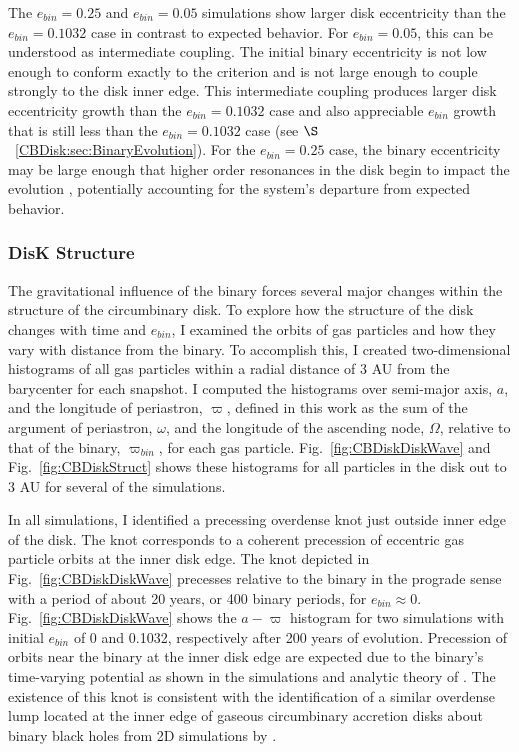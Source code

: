The $e_{bin} = 0.25$ and $e_{bin} = 0.05$ simulations show larger disk eccentricity than
the $e_{bin} = 0.1032$ case in contrast to expected behavior.  For
$e_{bin} = 0.05$, this can be understood as intermediate coupling.
The initial binary eccentricity is not low enough to conform exactly
to the \citet{Papaloizou2001} criterion and is not large enough to
couple strongly to the disk inner edge. This intermediate
coupling produces larger disk eccentricity growth than the $e_{bin} = 0.1032$ case and also
appreciable $e_{bin}$ growth that is still less than the $e_{bin} = 0.1032$ case (see $\S$~\ref{CBDisk:sec:BinaryEvolution}).  For
the $e_{bin} = 0.25$ case, the binary eccentricity may be large enough that higher order resonances in the disk begin to impact the evolution \citep{Artymowicz1992}, potentially accounting for the system's departure from expected behavior.


\subsubsection{DisK Structure} \label{CBDisk:sec:discStructEvolution}

The gravitational influence of the binary forces several major changes within the structure of the circumbinary disk.  To explore how the
structure of the disk changes with time and $e_{bin}$, I examined the orbits of gas
particles and how they vary with distance from the binary.  To
accomplish this, I created two-dimensional histograms of all gas particles
within a radial distance of 3 AU from the barycenter for
each snapshot.  I computed the histograms over semi-major
axis, $a$, and the longitude of periastron, $\varpi$, defined in this
work as the sum of the argument of periastron, $\omega$, and the
longitude of the ascending node, $\Omega$, relative to that of the binary, $\varpi_{bin}$, for each gas particle. 
Fig.~\ref{fig:CBDiskDiskWave} and Fig.~\ref{fig:CBDiskStruct} shows these histograms
for all particles in the disk out to 3 AU
for several of the simulations.

In all simulations, I identified a precessing overdense knot just outside
inner edge of the disk.  The knot corresponds to a coherent precession
of eccentric gas particle orbits at the inner disk edge.  The knot
depicted in Fig.~\ref{fig:CBDiskDiskWave} precesses relative to the binary
in the prograde sense with a period of about 20 years, or 400 binary
periods, for $e_{bin} \approx 0$.
Fig.~\ref{fig:CBDiskDiskWave} shows the $a - \varpi$ histogram 
for two simulations with initial $e_{bin}$ of 0 and 0.1032,
respectively after 200 years of evolution.
Precession of orbits near the binary at the inner disk edge are expected due to the binary's time-varying potential as shown in the simulations and analytic theory of \citet{Artymowicz2000}. The existence of this knot is consistent with the identification of a similar overdense lump located at the inner edge of 
gaseous circumbinary accretion disks about binary black holes from 2D simulations by \citet{Farris2014}.

